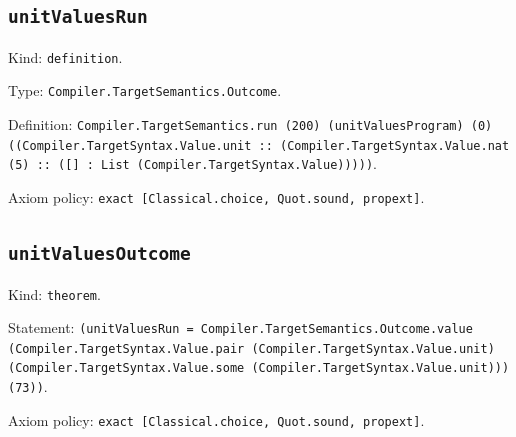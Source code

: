 \documentclass[11pt]{article}
\begin{document}
\subsection*{\texttt{unitValuesRun}}
\noindent Kind: \texttt{definition}.\par
\noindent Type: \texttt{Compiler.TargetSemantics.Outcome}.\par
\noindent Definition: \texttt{Compiler.TargetSemantics.run (200) (unitValuesProgram) (0) ((Compiler.TargetSyntax.Value.unit :: (Compiler.TargetSyntax.Value.nat (5) :: ([] : List (Compiler.TargetSyntax.Value)))))}.\par
\noindent Axiom policy: \texttt{exact [Classical.choice, Quot.sound, propext]}.\par
\subsection*{\texttt{unitValuesOutcome}}
\noindent Kind: \texttt{theorem}.\par
\noindent Statement: \texttt{(unitValuesRun = Compiler.TargetSemantics.Outcome.value (Compiler.TargetSyntax.Value.pair (Compiler.TargetSyntax.Value.unit) (Compiler.TargetSyntax.Value.some (Compiler.TargetSyntax.Value.unit))) (73))}.\par
\noindent Axiom policy: \texttt{exact [Classical.choice, Quot.sound, propext]}.\par
\end{document}
